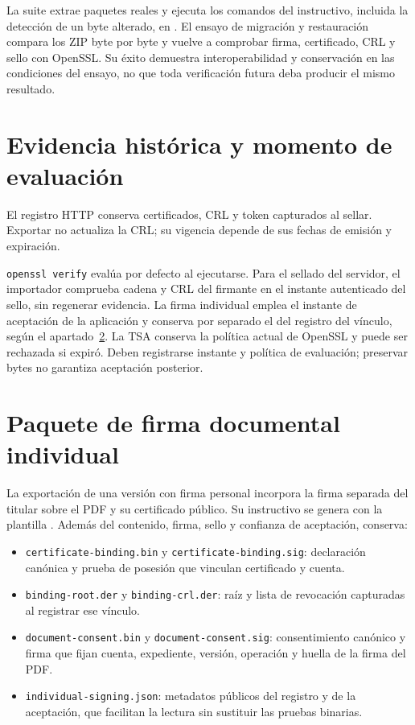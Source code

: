 La suite extrae paquetes reales y ejecuta los comandos del instructivo, incluida
la detección de un byte alterado, en
. El ensayo de migración y restauración
compara los ZIP byte por byte y vuelve a comprobar firma, certificado, CRL y sello
con OpenSSL. Su éxito demuestra interoperabilidad y conservación en las condiciones
del ensayo, no que toda verificación futura deba producir el mismo resultado.

\section{Evidencia histórica y momento de evaluación}\label{sec:verificacion-historica}

El registro HTTP conserva certificados, CRL y token capturados al sellar.
Exportar no actualiza la CRL; su vigencia depende de sus fechas de emisión y
expiración.

\texttt{openssl verify} evalúa por defecto al ejecutarse. Para el sellado del
servidor, el importador comprueba cadena y CRL del firmante en el instante
autenticado del sello, sin regenerar evidencia. La firma individual emplea el
instante de aceptación de la aplicación y conserva por separado el del registro
del vínculo, según el apartado~\ref{sec:verificacion-individual}. La TSA conserva la
política actual de OpenSSL y puede ser rechazada si expiró. Deben registrarse
instante y política de evaluación; preservar bytes no garantiza aceptación
posterior.

\section{Paquete de firma documental individual}\label{sec:verificacion-individual}

La exportación de una versión con firma personal incorpora la firma separada
del titular sobre el PDF y su certificado público. Su instructivo se genera
con la plantilla
.
Además del contenido, firma, sello y confianza de aceptación, conserva:

\begin{itemize}
  \item \texttt{certificate-binding.bin} y \texttt{certificate-binding.sig}:
    declaración canónica y prueba de posesión que vinculan certificado y cuenta.
  \item \texttt{binding-root.der} y \texttt{binding-crl.der}: raíz y lista de
    revocación capturadas al registrar ese vínculo.
  \item \texttt{document-consent.bin} y \texttt{document-consent.sig}:
    consentimiento canónico y firma que fijan cuenta, expediente, versión,
    operación y huella de la firma del PDF.
  \item \texttt{individual-signing.json}: metadatos públicos del registro y de
    la aceptación, que facilitan la lectura sin sustituir las pruebas binarias.
\end{itemize}


